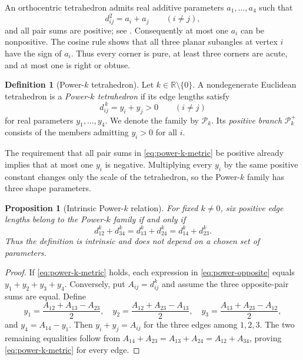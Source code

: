 \documentclass[11pt,a4paper]{article}
\newtheorem{proposition}[theorem]{Proposition}
\theoremstyle{definition}
\newtheorem{definition}[theorem]{Definition}
\theoremstyle{remark}
\newcommand{\R}{\mathbb{R}}
\begin{document}
An orthocentric tetrahedron admits real additive parameters
$a_1,\ldots,a_4$ such that
\begin{equation}\label{eq:orthocentric-metric}
 d_{ij}^2=a_i+a_j\qquad(i\ne j),
\end{equation}
and all pair sums are positive; see
\cite{EdmondsHajjaMartini2005,HajjaHammoudeh2014}.  Consequently at most one
$a_i$ can be nonpositive.  The cosine rule shows that all three planar
subangles at vertex $i$ have the sign of $a_i$.  Thus every corner is pure,
at least three corners are acute, and at most one is right or obtuse.

\begin{definition}[Power-$k$ tetrahedron]\label{def:power-k}
Let $k\in\R\setminus\{0\}$.  A nondegenerate Euclidean tetrahedron is a
\emph{Power-$k$ tetrahedron} if its edge lengths satisfy
\begin{equation}\label{eq:power-k-metric}
 d_{ij}^{\,k}=y_i+y_j>0\qquad(i\ne j)
\end{equation}
for real parameters $y_1,\ldots,y_4$.  We denote the family by
$\mathcal P_k$.  Its \emph{positive branch} $\mathcal P_k^+$ consists of the
members admitting $y_i>0$ for all $i$.
\end{definition}

The requirement that all pair sums in \eqref{eq:power-k-metric} be positive
already implies that at most one $y_i$ is negative.  Multiplying every $y_i$
by the same positive constant changes only the scale of the tetrahedron, so
the Power-$k$ family has three shape parameters.

\begin{proposition}[Intrinsic Power-$k$ relation]\label{prop:power-opposite}
For fixed $k\ne0$, six positive edge lengths belong to the Power-$k$ family
if and only if
\begin{equation}\label{eq:power-opposite}
 d_{12}^k+d_{34}^k
 =d_{13}^k+d_{24}^k
 =d_{14}^k+d_{23}^k.
\end{equation}
Thus the definition is intrinsic and does not depend on a chosen set of
parameters.
\end{proposition}

\begin{proof}
If \eqref{eq:power-k-metric} holds, each expression in
\eqref{eq:power-opposite} equals $y_1+y_2+y_3+y_4$.  Conversely, put
$A_{ij}=d_{ij}^k$ and assume the three opposite-pair sums are equal.  Define
\[
 y_1=\frac{A_{12}+A_{13}-A_{23}}2,\quad
 y_2=\frac{A_{12}+A_{23}-A_{13}}2,\quad
 y_3=\frac{A_{13}+A_{23}-A_{12}}2,
\]
and $y_4=A_{14}-y_1$.  Then $y_i+y_j=A_{ij}$ for the three edges among
$1,2,3$.  The two remaining equalities follow from
$A_{14}+A_{23}=A_{13}+A_{24}=A_{12}+A_{34}$, proving
\eqref{eq:power-k-metric} for every edge.
\end{proof}
\end{document}
